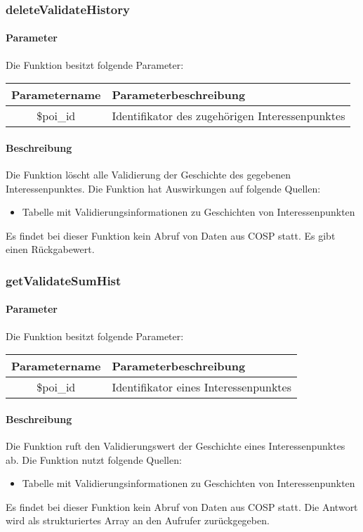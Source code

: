 \subsubsection{deleteValidateHistory}
\paragraph{Parameter} Die Funktion besitzt folgende Parameter:
\begin{table}[H]
	\begin{tabular}{|c|p{11cm}|}
		\hline
		\textbf{Parametername} & \textbf{Parameterbeschreibung} \\ \hline
		\$poi\_id & Identifikator des zugehörigen Interessenpunktes \\ \hline
	\end{tabular}
\end{table}
\paragraph{Beschreibung} Die Funktion löscht alle Validierung der Geschichte des gegebenen Interessenpunktes. Die Funktion hat Auswirkungen auf folgende Quellen:
\begin{itemize}
	\item Tabelle mit Validierungsinformationen zu Geschichten von Interessenpunkten
\end{itemize}
Es findet bei dieser Funktion kein Abruf von Daten aus {\glqq COSP\grqq} statt. Es gibt einen Rückgabewert.
\subsubsection{getValidateSumHist}
\paragraph{Parameter} Die Funktion besitzt folgende Parameter:
\begin{table}[H]
	\begin{tabular}{|c|p{11cm}|}
		\hline
		\textbf{Parametername} & \textbf{Parameterbeschreibung} \\ \hline
		\$poi\_id & Identifikator eines Interessenpunktes \\ \hline
	\end{tabular}
\end{table}
\paragraph{Beschreibung} Die Funktion ruft den Validierungswert der Geschichte eines Interessenpunktes ab. Die Funktion nutzt folgende Quellen:
\begin{itemize}
	\item Tabelle mit Validierungsinformationen zu Geschichten von Interessenpunkten
\end{itemize}
Es findet bei dieser Funktion kein Abruf von Daten aus {\glqq COSP\grqq} statt. Die Antwort wird als strukturiertes Array an den Aufrufer zurückgegeben.
